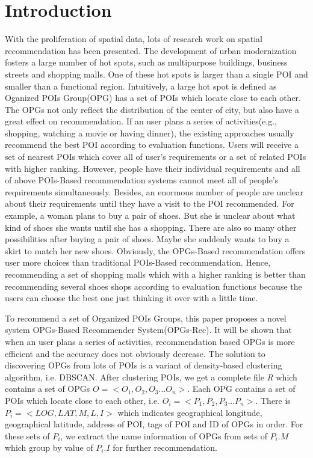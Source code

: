 \documentclass[envcountreset,oribibl]{llncs}
\begin{document}
\section{Introduction}
With the proliferation of spatial data, lots of research work on spatial recommendation has been presented. The development of urban modernization fosters a large number of hot spots, such as multipurpose buildings, business streets and shopping malls. One of these hot spots is larger than a single POI and smaller than a functional region\cite{Yuan12}. Intuitively, a large hot spot is defined as Oganized POIs Group(OPG)\cite{Xu15} has a set of POIs which locate close to each other. The OPGs not only reflect the distribution of the center of city, but also have a great effect on recommendation. If an user plans a series of activities(e.g., shopping, watching a movie or having dinner), the existing approaches usually recommend the best POI according to evaluation functions. Users will receive a set of nearest POIs which cover all of user's requirements\cite{Cao11} or a set of related POIs with higher ranking\cite{Chen15}. However, people have their individual requirements and all of above POIs-Based recommendation systems cannot meet all of people's requirements simultaneously. Besides, an enormous number of people are unclear about their requirements until they have a visit to the POI recommended. For example, a woman plans to buy a pair of shoes. But she is unclear about what kind of shoes she wants until she has a shopping. There are also so many other possibilities after buying a pair of shoes. Maybe she suddenly wants to buy a skirt to match her new shoes. Obviously, the OPGs-Based recommendation offers user more choices than traditional POIs-Based recommendation. Hence, recommending a set of shopping malls which with a higher ranking is better than recommending several shoes shops according to evaluation functions because the users can choose the best one just thinking it over with a little time.

To recommend a set of Organized POIs Groups, this paper proposes a novel system OPGs-Based Recommender System(OPGs-Rec). It will be shown that when an user plans a series of activities, recommendation based OPGs is more efficient and the accuracy does not obviously decrease. The solution to discovering OPGs from lots of POIs is a variant of density-based clustering algorithm, i.e. DBSCAN\cite{Xu15}. After clustering POIs, we get a complete file \textit{R} which contains a set of OPGs $O=<O_1, O_2, O_3...O_n>$. Each OPG contains a set of POIs which locate close to each other, i.e. $O_i=<P_1, P_2, P_3...P_n>$. There is $P_i=<LOG, LAT, M, L, I>$ which indicates geographical longitude, geographical latitude, address of POI, tags of POI and ID of OPGs in order. For these sets of $P_i$, we extract the name information of OPGs from sets of $P_i.M$ which group by value of $P_i.I$ for further recommendation.
\end{document}
